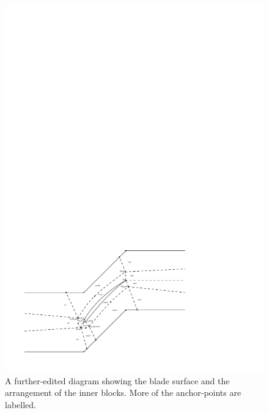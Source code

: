 \begin{figure}[htbp]
\begin{center}
\includegraphics[width=12cm,viewport=132 44 313 280,clip]{../2D/turbo_sc10/sc10-inner.pdf}
\end{center}
\caption{A further-edited diagram showing the blade surface and the arrangement
  of the inner blocks.  More of the anchor-points are labelled. }
\label{trubo-sc10-inner-geometry-fig}
\end{figure}


